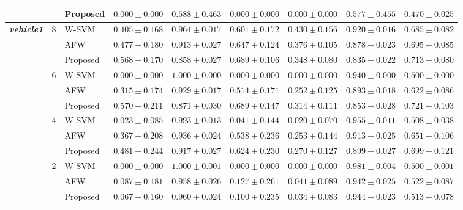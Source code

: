 \documentclass[pdflatex,sn-mathphys-num]{sn-jnl}%
\theoremstyle{thmstyleone}%
\theoremstyle{thmstyletwo}
\theoremstyle{thmstylethree}
\begin{document}
\begin{table}[htbp]
{\begin{tabular}{lllcccccc}
& & Proposed& $\mathbf{0.000 \pm 0.000}$ & $0.588 \pm 0.463$ & $\mathbf{0.000 \pm 0.000}$ & $\mathbf{0.000 \pm 0.000}$ & $0.577 \pm 0.455$ & $0.470 \pm 0.025$ \\
\midrule
\multirow{12}{*}{\textbf{\textit{vehicle1}}} 
& \multirow{3}{*}{8}
& W-SVM     & $0.405 \pm 0.168$ & $\mathbf{0.964 \pm 0.017}$ & $0.601 \pm 0.172$ & $\mathbf{0.430 \pm 0.156}$ & $\mathbf{0.920 \pm 0.016}$ & $0.685 \pm 0.082$ \\
& & AFW     & $0.477 \pm 0.180$ & $0.913 \pm 0.027$ & $0.647 \pm 0.124$ & $0.376 \pm 0.105$ & $0.878 \pm 0.023$ & $0.695 \pm 0.085$ \\
& & Proposed& $\mathbf{0.568 \pm 0.170}$ & $0.858 \pm 0.027$ & $\mathbf{0.689 \pm 0.106}$ & $0.348 \pm 0.080$ & $0.835 \pm 0.022$ & $\mathbf{0.713 \pm 0.080}$ \\
\cmidrule{2-9}
& \multirow{3}{*}{6}
& W-SVM     & $0.000 \pm 0.000$ & $\mathbf{1.000 \pm 0.000}$ & $0.000 \pm 0.000$ & $0.000 \pm 0.000$ & $\mathbf{0.940 \pm 0.000}$ & $0.500 \pm 0.000$ \\
& & AFW     & $0.315 \pm 0.174$ & $0.929 \pm 0.017$ & $0.514 \pm 0.171$ & $0.252 \pm 0.125$ & $0.893 \pm 0.018$ & $0.622 \pm 0.086$ \\
& & Proposed& $\mathbf{0.570 \pm 0.211}$ & $0.871 \pm 0.030$ & $\mathbf{0.689 \pm 0.147}$ & $\mathbf{0.314 \pm 0.111}$ & $0.853 \pm 0.028$ & $\mathbf{0.721 \pm 0.103}$ \\
\cmidrule{2-9}
& \multirow{3}{*}{4}
& W-SVM     & $0.023 \pm 0.085$ & $\mathbf{0.993 \pm 0.013}$ & $0.041 \pm 0.144$ & $0.020 \pm 0.070$ & $\mathbf{0.955 \pm 0.011}$ & $0.508 \pm 0.038$ \\
& & AFW     & $0.367 \pm 0.208$ & $0.936 \pm 0.024$ & $0.538 \pm 0.236$ & $0.253 \pm 0.144$ & $0.913 \pm 0.025$ & $0.651 \pm 0.106$ \\
& & Proposed& $\mathbf{0.481 \pm 0.244}$ & $0.917 \pm 0.027$ & $\mathbf{0.624 \pm 0.230}$ & $\mathbf{0.270 \pm 0.127}$ & $0.899 \pm 0.027$ & $\mathbf{0.699 \pm 0.121}$ \\
\cmidrule{2-9}
& \multirow{3}{*}{2}
& W-SVM     & $0.000 \pm 0.000$ & $\mathbf{1.000 \pm 0.001}$ & $0.000 \pm 0.000$ & $0.000 \pm 0.000$ & $\mathbf{0.981 \pm 0.004}$ & $0.500 \pm 0.001$ \\
& & AFW     & $\mathbf{0.087 \pm 0.181}$ & $0.958 \pm 0.026$ & $\mathbf{0.127 \pm 0.261}$ & $\mathbf{0.041 \pm 0.089}$ & $0.942 \pm 0.025$ & $\mathbf{0.522 \pm 0.087}$ \\
& & Proposed& $0.067 \pm 0.160$ & $0.960 \pm 0.024$ & $0.100 \pm 0.235$ & $0.034 \pm 0.083$ & $0.944 \pm 0.023$ & $0.513 \pm 0.078$ \\

\end{tabular}}
\end{table}
\end{document}
